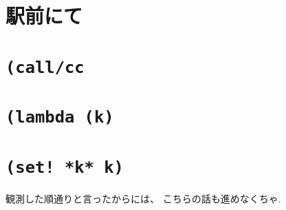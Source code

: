 

\section*{駅前にて}


\section*{\texttt{(call/cc}}


\section*{\texttt{(lambda (k)}}


\section*{\texttt{(set! *k* k)}}
観測した順通りと言ったからには、
こちらの話も進めなくちゃ.

